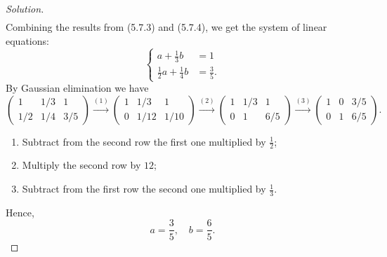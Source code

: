 \documentclass{article}[12pt]
\newenvironment{solution}
  {\renewcommand\qedsymbol{$\blacksquare$}\begin{proof}[Solution]}
  {\end{proof}}
\begin{document}
\begin{solution}
\begin{align*}
\end{align*}
Combining the results from (5.7.3) and (5.7.4), we get the system of linear equations:
\begin{equation*}
    \begin{cases}
        a + \frac{1}{3}b &= 1
        \\
        \frac{1}{2}a + \frac{1}{4}b &= \frac{3}{5}.
    \end{cases}
\end{equation*}
By Gaussian elimination we have
\begin{equation*}
    \begin{pmatrix} 1 & 1/3 & 1 \\ 1/2 & 1/4 & 3/5 \end{pmatrix} \stackrel{(1)}{\longrightarrow} \begin{pmatrix} 1 & 1/3 & 1 \\ 0 & 1/12 & 1/10 \end{pmatrix} \stackrel{(2)}{\longrightarrow} \begin{pmatrix} 1 & 1/3 & 1 \\ 0 & 1 & 6/5 \end{pmatrix} \stackrel{(3)}{\longrightarrow}\begin{pmatrix} 1 & 0 & 3/5 \\ 0 & 1 & 6/5 \end{pmatrix}.
\end{equation*}
\begin{enumerate}[label=(\arabic*)]
    \item Subtract from the second row the first one multiplied by $\tfrac{1}{2}$;
    \item Multiply the second row by $12$;
    \item Subtract from the first row the second one multiplied by $\tfrac{1}{3}$.
\end{enumerate}
Hence,
\begin{equation*}
    a = \dfrac{3}{5},\quad b = \dfrac{6}{5}.
\end{equation*}
\end{solution}
\end{document}
